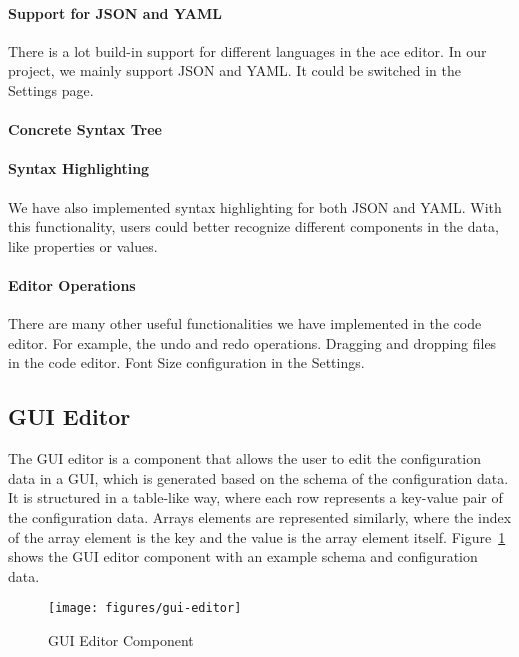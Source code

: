 \paragraph{Support for JSON and YAML}
There is a lot build-in support for different languages in the ace editor.
In our project, we mainly support JSON and YAML. It could be switched in the Settings page.

\paragraph{Concrete Syntax Tree}

\paragraph{Syntax Highlighting}
We have also implemented syntax highlighting for both JSON and YAML.
With this functionality, users could better recognize different components in the data, like properties or values.

\paragraph{Editor Operations}
There are many other useful functionalities we have implemented in the code editor.
For example, the undo and redo operations.
Dragging and dropping files in the code editor.
Font Size configuration in the Settings.


\subsection{GUI Editor}\label{subsec:gui-editor}

The GUI editor is a component that allows the user to edit the configuration data in a GUI, which is generated based on the schema of the configuration data.
It is structured in a table-like way, where each row represents a key-value pair of the configuration data.
Arrays elements are represented similarly, where the index of the array element is the key and the value is the array element itself.
Figure~\ref{fig:gui-editor} shows the GUI editor component with an example schema and configuration data.

\begin{figure}[!t]
    \centering
    \texttt{[image: figures/gui-editor]} %
    \caption{GUI Editor Component}
    \label{fig:gui-editor}
\end{figure}

